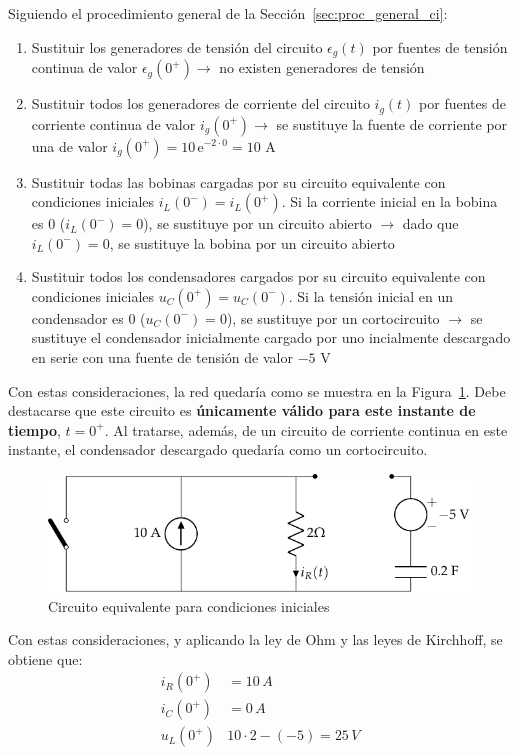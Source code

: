 \begin{example}
  Siguiendo el procedimiento general de la
  Sección~\ref{sec:proc_general_ci}:
  \begin{enumerate}
  \item Sustituir los generadores de tensión del circuito
    $\epsilon_g(t)$ por fuentes de tensión continua de valor
    $\epsilon_g(0^+) \rightarrow$ no existen generadores de tensión
  \item Sustituir todos los generadores de corriente del circuito
    $i_g(t)$ por fuentes de corriente continua de valor
    $i_g(0^+)\rightarrow$ se sustituye la fuente de corriente por una
    de valor $i_g(0^+)=10\,\mathrm{e}^{-2\cdot 0}=10$ A
  \item Sustituir todas las bobinas cargadas por su circuito
    equivalente con condiciones iniciales $i_L(0^-)=i_L(0^+)$. Si la
    corriente inicial en la bobina es 0 ($i_L(0^-)=0$), se sustituye
    por un circuito abierto $\rightarrow$ dado que $i_L(0^-)=0$, se
    sustituye la bobina por un circuito abierto
  \item Sustituir todos los condensadores cargados por su circuito
    equivalente con condiciones iniciales $u_C(0^+)=u_C(0^-)$. Si la
    tensión inicial en un condensador es 0 ($u_C(0^-)=0$), se
    sustituye por un cortocircuito $\rightarrow$ se sustituye el
    condensador inicialmente cargado por uno incialmente descargado en
    serie con una fuente de tensión de valor $-5$ V
  \end{enumerate}
  Con estas consideraciones, la red quedaría como se muestra en la
  Figura~\ref{fig:ej_cond_iniciales_0+}. Debe destacarse que este
  circuito es \textbf{únicamente válido para este instante de tiempo},
  $t=0^+$. Al tratarse, además, de un circuito de corriente continua
  en este instante, el condensador descargado quedaría como un
  cortocircuito.
  \begin{figure}[H]
    \centering \includegraphics{../figs/ej_cond_iniciales_0+.pdf}
    \caption{Circuito equivalente para condiciones iniciales}
    \label{fig:ej_cond_iniciales_0+}
  \end{figure}
	
  Con estas consideraciones, y aplicando la ley de Ohm y las leyes de
  Kirchhoff, se obtiene que:
  \begin{align*}
    i_R(0^+)&=10\,A\\
    i_C(0^+)&=0\,A\\
    u_L(0^+)&10\cdot 2 - (-5)=25\,V
  \end{align*}
	
\end{example}


